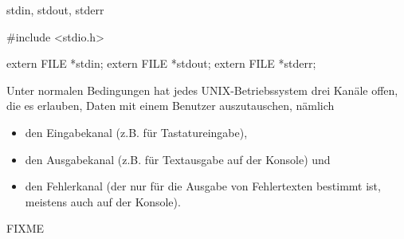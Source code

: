 \begin{man}{stdin, stdout, stderr}
    \begin{synopsis}
        \begin{plaincode}[gobble=8]
            #include <stdio.h>

            extern FILE *stdin;
            extern FILE *stdout;
            extern FILE *stderr;
        \end{plaincode}
    \end{synopsis}

    \begin{desc}
        Unter normalen Bedingungen hat jedes UNIX-Betriebssystem drei Kanäle offen, die es erlauben,
        Daten mit einem Benutzer auszutauschen, nämlich
        \begin{itemize}[noitemsep]
            \item den Eingabekanal (z.B. für Tastatureingabe),
            \item den Ausgabekanal (z.B. für Textausgabe auf der Konsole) und
            \item den Fehlerkanal (der nur für die Ausgabe von Fehlertexten bestimmt ist, meistens auch auf der Konsole).
        \end{itemize}
        FIXME
    \end{desc}



\end{man}

